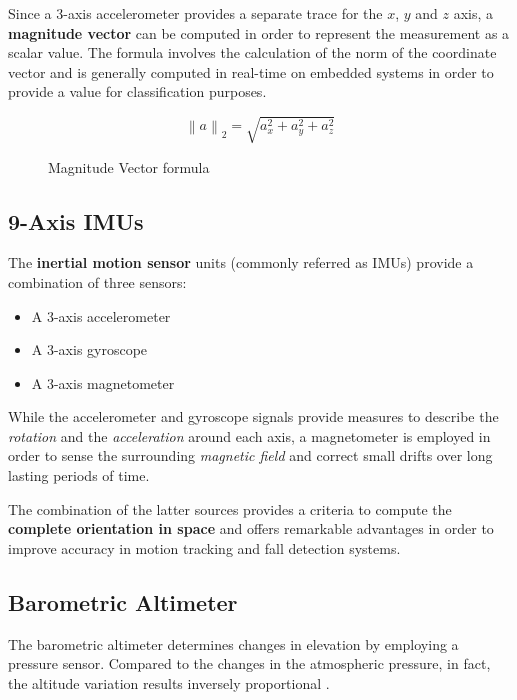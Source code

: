 Since a 3-axis accelerometer provides a separate trace for the $x$, $y$ and $z$ axis, a \textbf{magnitude vector} can be computed in order to represent the measurement as a scalar value. The formula involves the calculation of the norm of the coordinate vector and is generally computed in real-time on embedded systems in order to provide a value for classification purposes.

\newcommand\norm[1]{\left\lVert#1\right\rVert}

\begin{figure}[h]
    \begin{equation}
    \norm{a}_2 = \sqrt{a_{x}^2 + a_{y}^2 + a_{z}^2}
    \end{equation}
    \caption{Magnitude Vector formula}
    \label{fig:magnitude}
\end{figure}

\subsection{9-Axis IMUs}\label{subsec:imus}

The \textbf{inertial motion sensor} units (commonly referred as IMUs) provide a combination of three sensors:

\begin{itemize}
    \item A 3-axis accelerometer
    \item A 3-axis gyroscope 
    \item A 3-axis magnetometer 
\end{itemize}

While the accelerometer and gyroscope signals provide measures to describe the \emph{rotation} and the \emph{acceleration} around each axis, a magnetometer is employed in order to sense the surrounding \emph{magnetic field} and correct small drifts over long lasting periods of time. 

The combination of the latter sources provides a criteria to compute the \textbf{complete orientation in space} and offers remarkable advantages in order to improve accuracy in motion tracking and fall detection systems.

\subsection{Barometric Altimeter}\label{subsec:altimeter}

The barometric altimeter determines changes in elevation by employing a pressure sensor. Compared to the changes in the atmospheric pressure, in fact, the altitude variation results inversely proportional \cite{mems-altimeter}.

